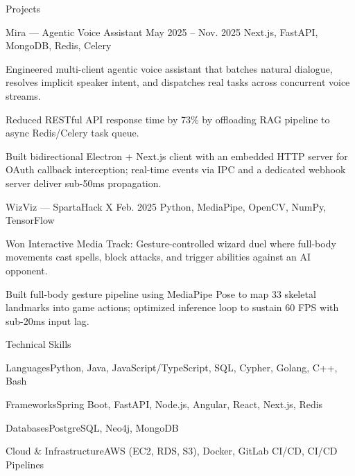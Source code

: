 \documentclass[
	11pt
]{../../../resume}
\begin{document}
	\begin{rSection}{P}{rojects}
		\begin{rSectionEntry}
			{Mira --- Agentic Voice Assistant}
			{May 2025 -- Nov. 2025}
			{}
			{Next.js, FastAPI, MongoDB, Redis, Celery}
			{}

			\item Engineered multi-client agentic voice assistant that batches natural dialogue, resolves implicit speaker intent, and dispatches real tasks across concurrent voice streams.
			\item Reduced RESTful API response time by 73\% by offloading RAG pipeline to async Redis/Celery task queue.
\item Built bidirectional Electron + Next.js client with an embedded HTTP server for OAuth callback interception; real-time events via IPC and a dedicated webhook server deliver sub-50ms propagation.
		\end{rSectionEntry}

		\begin{rSectionEntry}
			{WizViz --- SpartaHack X}
			{Feb. 2025}
			{}
			{Python, MediaPipe, OpenCV, NumPy, TensorFlow}
			{}

			\item Won Interactive Media Track: Gesture-controlled wizard duel where full-body movements cast spells, block attacks, and trigger abilities against an AI opponent.
			\item Built full-body gesture pipeline using MediaPipe Pose to map 33 skeletal landmarks into game actions; optimized inference loop to sustain 60 FPS with sub-20ms input lag.
		\end{rSectionEntry}
	\end{rSection}

	\begin{rSection}{T}{echnical Skills}
		\begin{rSet}{Languages}{Python, Java, JavaScript/TypeScript, SQL, Cypher, Golang, C++, Bash}
		\end{rSet}
		\begin{rSet}{Frameworks}{Spring Boot, FastAPI, Node.js, Angular, React, Next.js, Redis}
		\end{rSet}
		\begin{rSet}{Databases}{PostgreSQL, Neo4j, MongoDB}
		\end{rSet}
		\begin{rSet}{Cloud \& Infrastructure}{AWS (EC2, RDS, S3), Docker, GitLab CI/CD, CI/CD Pipelines}
		\end{rSet}
	\end{rSection}
\end{document}
